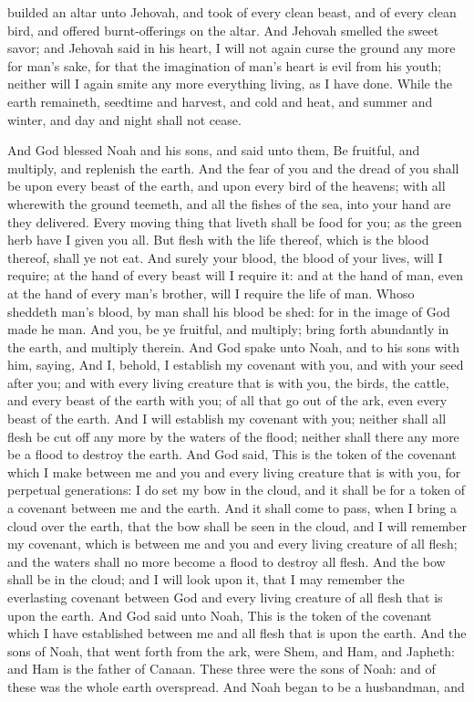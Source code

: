 builded an altar unto Jehovah, and took of every clean beast, and of every clean bird, and offered burnt-offerings on the altar. And Jehovah smelled the sweet savor; and Jehovah said in his heart, I will not again curse the ground any more for man’s sake, for that the imagination of man’s heart is evil from his youth; neither will I again smite any more everything living, as I have done. While the earth remaineth, seedtime and harvest, and cold and heat, and summer and winter, and day and night shall not cease. 

And God blessed Noah and his sons, and said unto them, Be fruitful, and multiply, and replenish the earth. And the fear of you and the dread of you shall be upon every beast of the earth, and upon every bird of the heavens; with all wherewith the ground teemeth, and all the fishes of the sea, into your hand are they delivered. Every moving thing that liveth shall be food for you; as the green herb have I given you all. But flesh with the life thereof, which is the blood thereof, shall ye not eat. And surely your blood, the blood of your lives, will I require; at the hand of every beast will I require it: and at the hand of man, even at the hand of every man’s brother, will I require the life of man. Whoso sheddeth man’s blood, by man shall his blood be shed: for in the image of God made he man. And you, be ye fruitful, and multiply; bring forth abundantly in the earth, and multiply therein.  And God spake unto Noah, and to his sons with him, saying, And I, behold, I establish my covenant with you, and with your seed after you; and with every living creature that is with you, the birds, the cattle, and every beast of the earth with you; of all that go out of the ark, even every beast of the earth. And I will establish my covenant with you; neither shall all flesh be cut off any more by the waters of the flood; neither shall there any more be a flood to destroy the earth. And God said, This is the token of the covenant which I make between me and you and every living creature that is with you, for perpetual generations: I do set my bow in the cloud, and it shall be for a token of a covenant between me and the earth. And it shall come to pass, when I bring a cloud over the earth, that the bow shall be seen in the cloud, and I will remember my covenant, which is between me and you and every living creature of all flesh; and the waters shall no more become a flood to destroy all flesh. And the bow shall be in the cloud; and I will look upon it, that I may remember the everlasting covenant between God and every living creature of all flesh that is upon the earth. And God said unto Noah, This is the token of the covenant which I have established between me and all flesh that is upon the earth.  And the sons of Noah, that went forth from the ark, were Shem, and Ham, and Japheth: and Ham is the father of Canaan. These three were the sons of Noah: and of these was the whole earth overspread.  And Noah began to be a husbandman, and 
